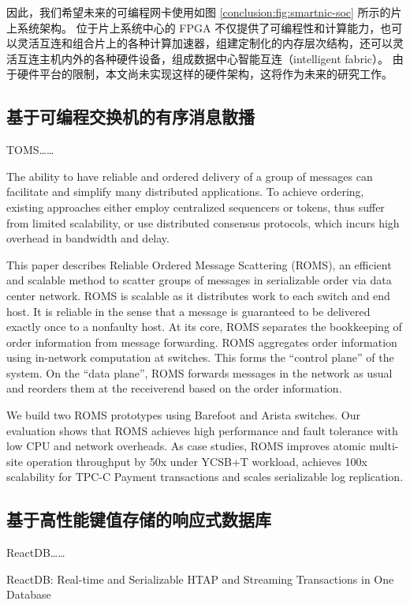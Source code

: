 因此，我们希望未来的可编程网卡使用如图 \ref{conclusion:fig:smartnic-soc} 所示的片上系统架构。
位于片上系统中心的 FPGA 不仅提供了可编程性和计算能力，也可以灵活互连和组合片上的各种计算加速器，组建定制化的内存层次结构，还可以灵活互连主机内外的各种硬件设备，组成数据中心智能互连（intelligent fabric）。
由于硬件平台的限制，本文尚未实现这样的硬件架构，这将作为未来的研究工作。

\subsection{基于可编程交换机的有序消息散播}

TOMS……

The ability to have reliable and ordered delivery of a group of messages can facilitate and simplify many distributed applications. To achieve ordering, existing approaches either employ centralized sequencers or tokens, thus suffer from limited scalability, or use distributed consensus protocols, which incurs high overhead in bandwidth and delay.

This paper describes Reliable Ordered Message Scattering (ROMS), an efficient and scalable method to scatter groups of messages in serializable order via data center network. ROMS is scalable as it distributes work to each switch and end host. It is reliable in the sense that a message is guaranteed to be delivered exactly once to a nonfaulty host. At its core, ROMS separates the bookkeeping of order information from message forwarding. ROMS aggregates order information using in-network computation at switches. This forms the “control plane” of the system. On the “data plane”, ROMS forwards messages in the network as usual and reorders them at the receiverend based on the order information.

We build two ROMS prototypes using Barefoot and Arista switches. Our evaluation shows that ROMS achieves high performance and fault tolerance with low CPU and network overheads. As case studies, ROMS improves atomic multi-site operation throughput by 50x under YCSB+T workload, achieves 100x scalability for TPC-C Payment transactions and scales serializable log replication.


\subsection{基于高性能键值存储的响应式数据库}

ReactDB……

ReactDB: Real-time and Serializable HTAP and Streaming Transactions in One Database

